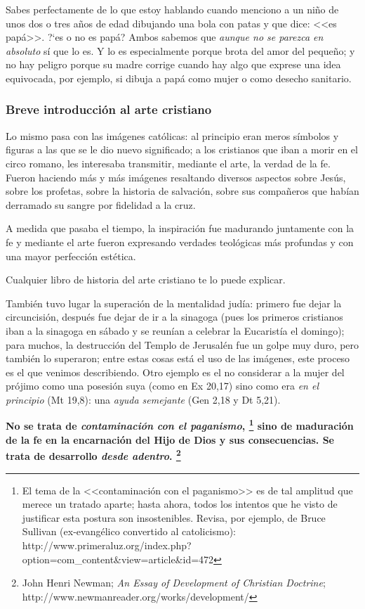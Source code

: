 \documentclass{article}
\begin{document}
\noindent
Sabes perfectamente de lo que estoy hablando cuando menciono a un ni\~no de unos dos o tres a\~nos de edad dibujando una bola con patas y que dice: <<es pap\'a>>. ?`es o no es pap\'a? Ambos sabemos que \emph{aunque no se parezca en absoluto} s\'{i} que lo es. Y lo es especialmente porque brota del amor del peque\~no; y no hay peligro porque su madre corrige cuando hay algo que exprese una idea equivocada, por ejemplo, si dibuja a pap\'a como mujer o como desecho sanitario.

\subsubsection{Breve introducci\'on al arte cristiano}

Lo mismo pasa con las im\'agenes cat\'olicas: al principio eran meros s\'imbolos y figuras a las que se le dio nuevo significado; a los cristianos que iban a morir en el circo romano, les interesaba transmitir, mediante el arte, la verdad de la fe. Fueron haciendo m\'as y m\'as im\'agenes resaltando diversos aspectos sobre Jes\'us, sobre los profetas, sobre la historia de salvaci\'on, sobre sus compa\~neros que hab\'{i}an derramado su sangre por fidelidad a la cruz.

A medida que pasaba el tiempo, la inspiraci\'on fue madurando juntamente con la fe y mediante el arte fueron expresando verdades teol\'ogicas m\'as profundas y con una mayor perfecci\'on est\'etica.

Cualquier libro de historia del arte cristiano te lo puede explicar.

Tambi\'en tuvo lugar la superaci\'on de la mentalidad jud\'{i}a: primero fue dejar la circuncisi\'on, despu\'es fue dejar de ir a la sinagoga (pues los primeros cristianos iban a la sinagoga en s\'abado y se reun\'{i}an a celebrar la Eucarist\'{i}a el domingo); para muchos, la destrucci\'on del Templo de Jerusal\'en fue un golpe muy duro, pero tambi\'en lo superaron; entre estas cosas est\'a el uso de las im\'agenes, este proceso es el que venimos describiendo. Otro ejemplo es el no considerar a la mujer del pr\'ojimo como una posesi\'on suya (como en Ex 20,17) sino como era \emph{en el principio} (Mt 19,8): una \emph{ayuda semejante} (Gen 2,18 y Dt 5,21).

\textbf{No se trata de \emph{contaminaci\'on con el paganismo},%
    \footnote{El tema de la <<contaminaci\'on con el paganismo>> es de tal amplitud que merece un tratado aparte; hasta ahora, todos los intentos que he visto de justificar esta postura son insostenibles. Revisa, por ejemplo, de Bruce Sullivan (ex-evang\'elico convertido al catolicismo): 
    http://www.primeraluz.org/index.php?option=com\_content\&view=article\&id=472}
sino de maduraci\'on de la fe en la encarnaci\'on del Hijo de Dios y sus consecuencias. Se trata de desarrollo \emph{desde adentro}.%
    \footnote{John Henri Newman; \emph{An Essay of Development of Christian Doctrine}; http://www.newmanreader.org/works/development/}}
    
\end{document}
